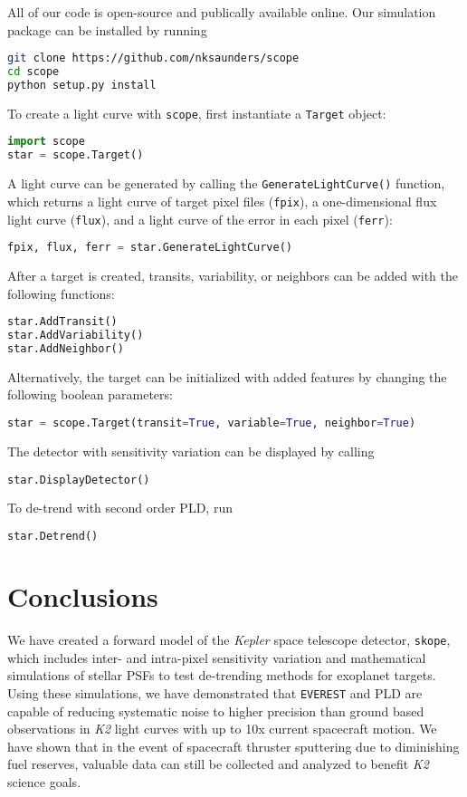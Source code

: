 \documentclass[12pt,preprint]{aastex}
\begin{document}
All of our code is open-source and publically available online. Our simulation package can be installed by running
%
\begin{lstlisting}[language=bash]
git clone https://github.com/nksaunders/scope
cd scope
python setup.py install
\end{lstlisting}
%
To create a light curve with \texttt{scope}, first instantiate a \texttt{Target} object:
%
\begin{lstlisting}[language=Python]
import scope
star = scope.Target()
\end{lstlisting}
%
A light curve can be generated by calling the \texttt{GenerateLightCurve()} function, which returns a light curve of target pixel files (\texttt{fpix}), a one-dimensional flux light curve (\texttt{flux}), and a light curve of the error in each pixel (\texttt{ferr}):
%
\begin{lstlisting}[language=Python]
fpix, flux, ferr = star.GenerateLightCurve()
\end{lstlisting}
%
After a target is created, transits, variability, or neighbors can be added with the following functions:
%
\begin{lstlisting}[language=Python]
star.AddTransit()
star.AddVariability()
star.AddNeighbor()
\end{lstlisting}
Alternatively, the target can be initialized with added features by changing the following boolean parameters:
%
\begin{lstlisting}[language=Python]
star = scope.Target(transit=True, variable=True, neighbor=True)
\end{lstlisting}
%
The detector with sensitivity variation can be displayed by calling
%
\begin{lstlisting}[language=Python]
star.DisplayDetector()
\end{lstlisting}
%
To de-trend with second order PLD, run
\begin{lstlisting}[language=Python]
star.Detrend()
\end{lstlisting}
\section{Conclusions}

We have created a forward model of the \textit{Kepler} space telescope detector, \texttt{skope}, which includes inter- and intra-pixel sensitivity variation and mathematical simulations of stellar PSFs to test de-trending methods for exoplanet targets. Using these simulations, we have demonstrated that \texttt{EVEREST} and PLD are  capable of reducing systematic noise to higher precision than ground based observations in \textit{K2} light curves with up to 10x current spacecraft motion. We have shown that in the event of spacecraft thruster sputtering due to diminishing fuel reserves, valuable data can still be collected and analyzed to benefit \textit{K2} science goals.
\end{document}
